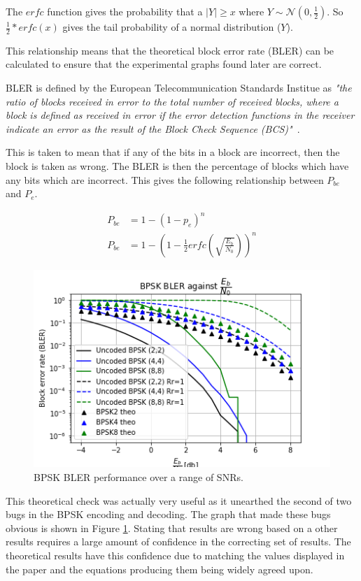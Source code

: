 \documentclass[12pt,onecolumn,letterpaper]{article}
\begin{document}
The $erfc$ function gives the probability that a $\left| Y \right| \ge x$ where $Y \sim \mathcal{N}(0,\frac{1}{2})$. So $\frac{1}{2}*erfc(x)$ gives the tail probability of a normal distribution ($Y$). 

This relationship means that the theoretical block error rate (BLER) can be calculated to ensure that the experimental graphs found later are correct.

BLER is defined by the European Telecommunication Standards Institue as \textit{"the ratio of blocks received in error to the total number of received blocks, where a block is defined as received in error if the error detection functions in the receiver indicate an error as the result of the Block Check Sequence (BCS)"}~\cite{BlerEtsiDefinition}.

This is taken to mean that if any of the bits in a block are incorrect, then the block is taken as wrong. The BLER is then the percentage of blocks which have any bits which are incorrect. This gives the following relationship between $P_{be}$ and $P_e$. 

\begin{align}
   P_{be} &= 1 - (1-p_e)^n \\
   P_{be} &= 1 - \left(1-\frac{1}{2}erfc\left(\sqrt{\frac{E_b}{N_0}}\right)\right)^n
   \label{eq:BpskTheoBler}
\end{align}

\begin{figure}[t]
   \centering
   \includegraphics[width=0.6\linewidth]{figures/bpsk_theo_Rr1_and_original.png}
   \caption{BPSK BLER performance over a range of SNRs.}
   \label{fig:BspkBlerComp}
\end{figure}

This theoretical check was actually very useful as it unearthed the second of two bugs in the BPSK encoding and decoding. The graph that made these bugs obvious is shown in Figure \ref{fig:BspkBlerComp}. Stating that results are wrong based on a other results requires a large amount of confidence in the correcting set of results. The theoretical results have this confidence due to matching the values displayed in the paper and the equations producing them being widely agreed upon.
\end{document}
